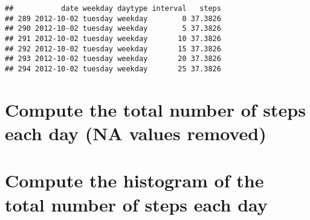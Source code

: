 \documentclass[]{article}
\newenvironment{Shaded}{\begin{snugshade}}{\end{snugshade}}
\newcommand{\KeywordTok}[1]{\textcolor[rgb]{0.13,0.29,0.53}{\textbf{#1}}}
\newcommand{\DataTypeTok}[1]{\textcolor[rgb]{0.13,0.29,0.53}{#1}}
\newcommand{\DecValTok}[1]{\textcolor[rgb]{0.00,0.00,0.81}{#1}}
\newcommand{\CharTok}[1]{\textcolor[rgb]{0.31,0.60,0.02}{#1}}
\newcommand{\StringTok}[1]{\textcolor[rgb]{0.31,0.60,0.02}{#1}}
\newcommand{\OperatorTok}[1]{\textcolor[rgb]{0.81,0.36,0.00}{\textbf{#1}}}
\newcommand{\NormalTok}[1]{#1}
\begin{document}
\begin{verbatim}
##           date weekday daytype interval   steps
## 289 2012-10-02 tuesday weekday        0 37.3826
## 290 2012-10-02 tuesday weekday        5 37.3826
## 291 2012-10-02 tuesday weekday       10 37.3826
## 292 2012-10-02 tuesday weekday       15 37.3826
## 293 2012-10-02 tuesday weekday       20 37.3826
## 294 2012-10-02 tuesday weekday       25 37.3826
\end{verbatim}

\section{Compute the total number of steps each day (NA values
removed)}\label{compute-the-total-number-of-steps-each-day-na-values-removed}

\begin{Shaded}
\end{Shaded}

\section{Compute the histogram of the total number of steps each
day}\label{compute-the-histogram-of-the-total-number-of-steps-each-day}

\begin{Shaded}
\end{Shaded}
\end{document}
